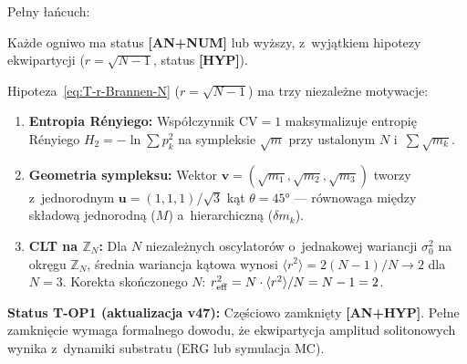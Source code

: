 \begin{remark}%
\label{rem:T-deduction-chain}
Pe\l{}ny \l{}a\'ncuch:
\begin{center}
\end{center}
Ka\.zde ogniwo ma status \textbf{[AN+NUM]} lub wy\.zszy,
z~wyj\k{a}tkiem hipotezy ekwipartycji
($r = \sqrt{N-1}$, status \textbf{[HYP]}).
\end{remark}

\begin{remark}%
\label{rem:T-equipartition-motivation}
Hipoteza~\eqref{eq:T-r-Brannen-N} ($r = \sqrt{N-1}$)
ma trzy niezale\.zne motywacje:

\begin{enumerate}[nosep]
  \item \textbf{Entropia R\'enyiego:}
    Wsp\'o\l{}czynnik $\mathrm{CV} = 1$ maksymalizuje
    entropi\k{e} R\'enyiego $H_2 = -\ln\sum p_k^2$
    na sympleksie $\sqrt{m}$
    przy ustalonym $N$ i~$\sum\sqrt{m_k}$.

  \item \textbf{Geometria sympleksu:}
    Wektor $\mathbf{v} = (\sqrt{m_1},\sqrt{m_2},\sqrt{m_3})$
    tworzy z~jednorodnym $\mathbf{u} = (1,1,1)/\sqrt{3}$
    k\k{a}t $\theta = 45°$ --- r\'ownowaga mi\k{e}dzy
    sk\l{}adow\k{a} jednorodn\k{a} ($M$)
    a~hierarchiczn\k{a} ($\delta m_k$).

  \item \textbf{CLT na $\mathbb{Z}_N$:}
    Dla $N$ niezale\.znych oscylator\'ow o~jednakowej
    wariancji $\sigma_0^2$ na okr\k{e}gu $\mathbb{Z}_N$,
    \'srednia wariancja k\k{a}towa wynosi
    $\langle r^2 \rangle = 2(N-1)/N \to 2$ dla $N = 3$.
    Korekta sko\'nczonego $N$:
    $r_{\rm eff}^2 = N \cdot \langle r^2 \rangle / N = N-1 = 2$.
\end{enumerate}

\noindent\textbf{Status T-OP1 (aktualizacja v47):}
Cz\k{e}\'sciowo zamkni\k{e}ty \textbf{[AN+HYP]}.
Pe\l{}ne zamkni\k{e}cie wymaga formalnego dowodu,
\.ze ekwipartycja amplitud solitonowych
wynika z~dynamiki substratu (ERG lub symulacja MC).
\end{remark}


